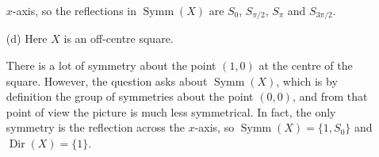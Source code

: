 \documentclass{amsart}
\DeclareMathOperator{\Dir}{Dir}
\DeclareMathOperator{\Symm}{Symm}
\renewcommand{\:}{\colon}
\theoremstyle{definition}
\newenvironment{solution}{{\noindent\bf Solution:}}{}
\begin{document}
\begin{solution}
\begin{itemize}
  $x$-axis, so the reflections in $\Symm(X)$ are $S_0$, $S_{\pi/2}$,
  $S_\pi$ and $S_{3\pi/2}$. 
 \item[(d)] Here $X$ is an off-centre square.
  \begin{center}
  \end{center}

  There is a lot of symmetry about the point $(1,0)$ at the centre of
  the square.  However, the question asks about $\Symm(X)$, which is by
  definition the group of symmetries about the point $(0,0)$, and from
  that point of view the picture is much less symmetrical.  In fact,
  the only symmetry is the reflection across the $x$-axis, so
  $\Symm(X)=\{1,S_0\}$ and $\Dir(X)=\{1\}$.
 \end{itemize}
\end{solution}
\end{document}
